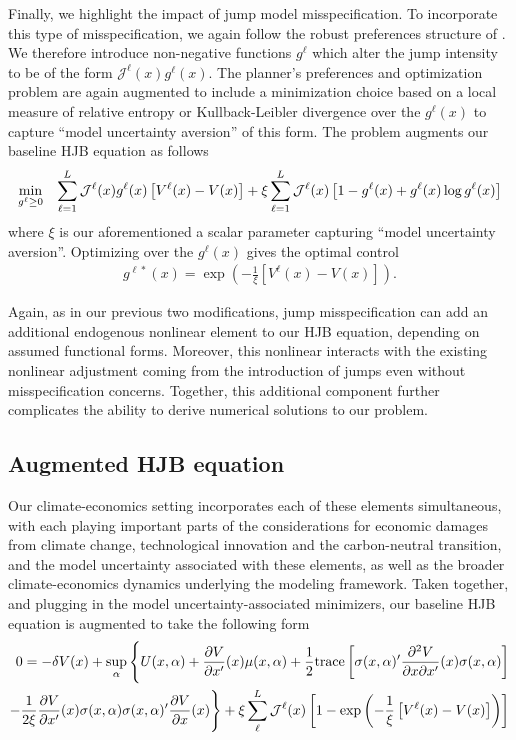 \documentclass[12pt]{article}
\begin{document}
Finally, we highlight the impact of jump model misspecification. To incorporate this type of misspecification, we again follow the robust preferences structure of \cite{hansen2011robustness}. We therefore introduce non-negative functions $g^{\ell}$ which alter the jump intensity to be of the form $\mathcal{J}^{\ell}(x) g^{\ell}(x)$. The planner's preferences and optimization problem are again augmented to include a minimization choice based on a local measure of relative entropy or Kullback-Leibler divergence over the $g^{\ell}(x)$ to capture ``model uncertainty aversion'' of this form. The problem augments our baseline HJB equation as follows
\begin{eqnarray*} 
\min_{g^\ell \ge 0} \hspace{.3cm}  \sum_{\ell=1} ^L {\mathcal J}^\ell(x) g^\ell(x) \left[   V^\ell(x) - V (x) \right] +  \xi  \sum_{\ell = 1} ^L  {\mathcal J}^\ell(x)\left[ 1 - g^\ell(x)    + g^\ell(x)   \log g^\ell(x)\right]
\end{eqnarray*}
where $\xi$ is our aforementioned a scalar parameter capturing ``model uncertainty aversion''. Optimizing over the $g^{\ell}(x)$ gives the optimal control 
\begin{eqnarray*} 
g^{\ell*}( x)  = \exp \left( - {\frac{1}{\xi}} \left[ V^\ell(x) - V (x) \right] \right).
\end{eqnarray*}

Again, as in our previous two modifications, jump misspecification can add an additional endogenous nonlinear element to our HJB equation, depending on assumed functional forms. Moreover, this nonlinear interacts with the existing nonlinear adjustment coming from the introduction of jumps even without misspecification concerns. Together, this additional component further complicates the ability to derive numerical solutions to our problem.

\subsection{Augmented HJB equation}

Our climate-economics setting incorporates each of these elements simultaneous, with each playing important parts of the considerations for economic damages from climate change, technological innovation and the carbon-neutral transition, and the model uncertainty associated with these elements, as well as the broader climate-economics dynamics underlying the modeling framework. Taken together, and plugging in the model uncertainty-associated minimizers, our baseline HJB equation is augmented to take the following form
\begin{eqnarray*} \label{diffusion_no_distortion} 
0 = -\delta V(x) + \sup_\alpha\Bigg\{ U(x, \alpha) + \frac{\partial V }{\partial x'}(x)\mu(x,\alpha) + \frac 1 2 {\rm trace}\left[\sigma(x,\alpha)' \frac{\partial^2 V }{\partial x \partial x'}(x)\sigma(x,\alpha)\right] \\
- \frac 1 {2 \xi} \frac{\partial V }{\partial x'}(x)\sigma(x,\alpha)\sigma(x,\alpha)'\frac{\partial V }{\partial x}(x)\Bigg\} + \xi  \sum_\ell^L {\mathcal J}^\ell(x) \left[ 1 -    \exp \left( - {\frac{1}{\xi}} \left[ V^\ell(x) - V (x) \right] \right) \right]
\end{eqnarray*}
\end{document}
